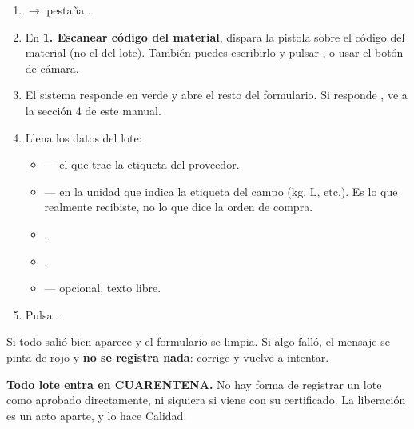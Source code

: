 \begin{enumerate}
    \item {} $\rightarrow$ pestaña .
    \item En \textbf{1. Escanear código del material}, dispara la pistola sobre el código
          del material (no el del lote). También puedes escribirlo y pulsar ,
          o usar el botón de cámara.
    \item El sistema responde  en verde y abre el resto del
          formulario. Si responde , ve a la sección 4 de este manual.
    \item Llena los datos del lote:
        \begin{itemize}
            \item {} --- el que trae la etiqueta del proveedor.
            \item {} --- en la unidad que indica la etiqueta del campo
                  (kg, L, etc.). Es lo que realmente recibiste, no lo que dice la orden de compra.
            \item {}.
            \item {}.
            \item {} --- opcional, texto libre.
        \end{itemize}
    \item Pulsa .
\end{enumerate}


\vspace{6pt}

Si todo salió bien aparece  y el
formulario se limpia. Si algo falló, el mensaje se pinta de rojo y \textbf{no se
registra nada}: corrige y vuelve a intentar.


\begin{cajaCuarentena}
\textbf{Todo lote entra en CUARENTENA.} No hay forma de registrar un lote como
aprobado directamente, ni siquiera si viene con su certificado. La liberación es
un acto aparte, y lo hace Calidad.
\end{cajaCuarentena}

